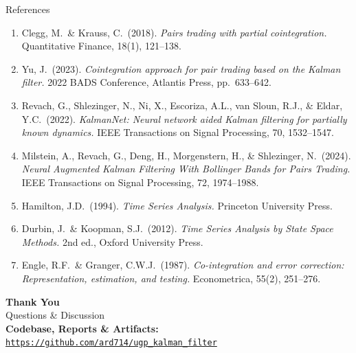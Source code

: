 \documentclass[10pt, aspectratio=169]{beamer}
\begin{document}
\begin{frame}{References}
  \footnotesize
  \begin{enumerate}
    \item Clegg, M.\ \& Krauss, C.\ (2018). \emph{Pairs trading with partial cointegration.} Quantitative Finance, 18(1), 121--138.
    \item Yu, J.\ (2023). \emph{Cointegration approach for pair trading based on the Kalman filter.} 2022 BADS Conference, Atlantis Press, pp.\ 633--642.
    \item Revach, G., Shlezinger, N., Ni, X., Escoriza, A.L., van Sloun, R.J., \& Eldar, Y.C.\ (2022). \emph{KalmanNet: Neural network aided Kalman filtering for partially known dynamics.} IEEE Transactions on Signal Processing, 70, 1532--1547.
    \item Milstein, A., Revach, G., Deng, H., Morgenstern, H., \& Shlezinger, N.\ (2024). \emph{Neural Augmented Kalman Filtering With Bollinger Bands for Pairs Trading.} IEEE Transactions on Signal Processing, 72, 1974--1988.
    \item Hamilton, J.D.\ (1994). \emph{Time Series Analysis.} Princeton University Press.
    \item Durbin, J.\ \& Koopman, S.J.\ (2012). \emph{Time Series Analysis by State Space Methods.} 2nd ed., Oxford University Press.
    \item Engle, R.F.\ \& Granger, C.W.J.\ (1987). \emph{Co-integration and error correction: Representation, estimation, and testing.} Econometrica, 55(2), 251--276.
  \end{enumerate}
\end{frame}

\begin{frame}{}
  \begin{center}
    {\Huge \textbf{Thank You}}\\[14pt]
    {\Large Questions \& Discussion}\\[18pt]
    {\normalsize \textbf{Codebase, Reports \& Artifacts:}}\\
    \texttt{\url{https://github.com/ard714/ugp_kalman_filter}}
  \end{center}
\end{frame}
\end{document}
